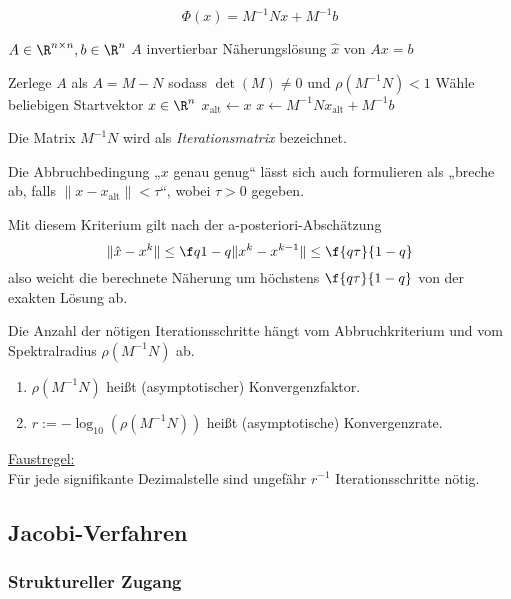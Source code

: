\documentclass[a4paper]{scrartcl}
\numberwithin{equation}{section}
\begin{document}
\begin{alg}~
	\[
		\Phi(x) = M^{-1}Nx + M^{-1}b
	\]
	\begin{algorithmic}
		\Input $A\in \R^{n\times n}, b\in \R^n$
		\Assume $A$ invertierbar
		\Output Näherungslösung $\hat x$ von $Ax = b$
		\Statex

		\State Zerlege $A$ als $A=M-N$ sodass $\det(M)\neq 0$ und $\rho(M^{-1}N) <1$
		\State Wähle beliebigen Startvektor $x \in \R^n$
			\State $x_{\text{alt}} \gets x$
			\State $x \gets M^{-1}Nx_{\text{alt}} + M^{-1}b$
		\EndWhile
	\end{algorithmic}
\end{alg}
\begin{note}
	Die Matrix $M^{-1}N$ wird als \emph{Iterationsmatrix} bezeichnet.
\end{note}

Die Abbruchbedingung „$x$ genau genug“ lässt sich auch formulieren als
„breche ab, falls $\|x-x_{\text{alt}}\|<\tau$“, wobei $\tau > 0$ gegeben.

Mit diesem Kriterium gilt nach der a-posteriori-Abschätzung
\[
	\|\hat x - x^k\| \le \f q{1-q}\|x^{k}-x^{k-1}\| \le \f {q\tau}{1-q} 
\]
also weicht die berechnete Näherung um höchstens $\f {q\tau}{1-q}$ von der exakten Lösung ab.

Die Anzahl der nötigen Iterationsschritte hängt vom Abbruchkriterium und vom Spektralradius $\rho(M^{-1}N)$ ab.

\begin{df}
	\label{df:4.7}
	\begin{enumerate}[1.]
		\item
			$\rho(M^{-1}N)$ heißt (asymptotischer) Konvergenzfaktor.
		\item
			$r := -\log_{10}(\rho(M^{-1}N))$ heißt (asymptotische) Konvergenzrate.
	\end{enumerate}
\end{df}

\underline{Faustregel:}\\
Für jede signifikante Dezimalstelle sind ungefähr $r^{-1}$ Iterationsschritte nötig.



\setcounter{subsection}{1} %
\subsection{Jacobi-Verfahren}

\subsubsection*{Struktureller Zugang}
\end{document}

